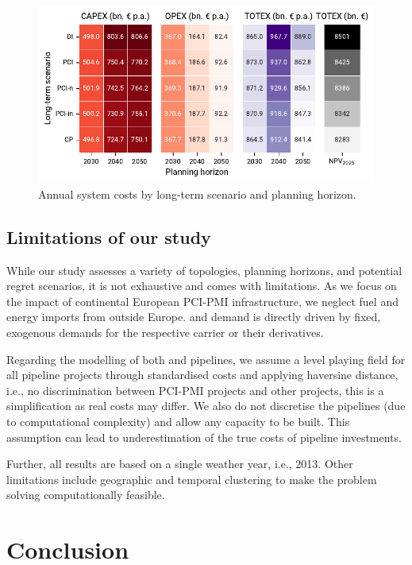 \documentclass[preprint,12pt,sort&compress]{elsarticle}
\begin{document}
\begin{figure}[htbp]
  \centering
  \includegraphics[width=\textwidth]{totex_heatmap.pdf}
  \caption{Annual system costs by long-term scenario and planning horizon.}
  \label{fig:totex_heatmap}
\end{figure}

\clearpage

\subsection{Limitations of our study}
\label{sec:limitations}
While our study assesses a variety of topologies, planning horizons, and potential regret scenarios, it is not exhaustive and comes with limitations.
As we focus on the impact of continental European PCI-PMI infrastructure, we neglect fuel and energy imports from outside Europe.  and  demand is directly driven by fixed, exogenous demands for the respective carrier or their derivatives.

Regarding the modelling of both  and  pipelines, we assume a level playing field for all pipeline projects through standardised costs and applying haversine distance, i.e., no discrimination between PCI-PMI projects and other projects, this is a simplification as real costs may differ. We also do not discretise the pipelines (due to computational complexity) and allow any capacity to be built. This assumption can lead to underestimation of the true costs of pipeline investments.

Further, all results are based on a single weather year, i.e., 2013.
Other limitations include geographic and temporal clustering to make the problem solving computationally feasible.

\newpage
\section{Conclusion}
\label{sec:conclusion}
\end{document}
